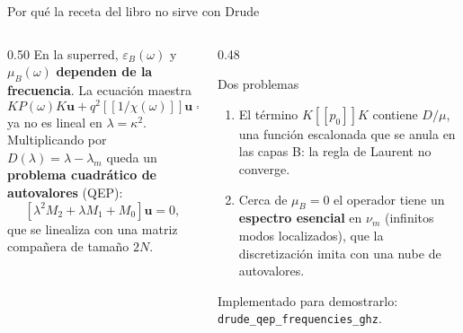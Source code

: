 \documentclass[aspectratio=169,10pt]{beamer}
\newcommand{\num}{\nu_m}
\newcommand{\toep}[1]{[\![#1]\!]}
\begin{document}
\begin{frame}{Por qué la receta del libro no sirve con Drude}
  \begin{columns}[T]
    \begin{column}{0.50\textwidth}
      \small
      En la superred, $\varepsilon_B(\omega)$ y $\mu_B(\omega)$ \textbf{dependen de la frecuencia}. La ecuación maestra
      \[K P(\omega) K\mathbf u + q^2\toep{1/\chi(\omega)}\mathbf u=\kappa^2\toep{\psi(\omega)}\mathbf u\]
      ya no es lineal en $\lambda=\kappa^2$. Multiplicando por $D(\lambda)=\lambda-\lambda_m$ queda un
      \textbf{problema cuadrático de autovalores} (QEP):
      \[\left[\lambda^2M_2+\lambda M_1+M_0\right]\mathbf u=0,\]
      que se linealiza con una matriz compañera de tamaño $2N$.
    \end{column}
    \begin{column}{0.48\textwidth}
      \begin{alertblock}{Dos problemas}
        \small
        \begin{enumerate}
          \item El término $K\toep{p_0}K$ contiene $D/\mu$, una función escalonada que se anula en las
            capas B: la regla de Laurent no converge.
          \item Cerca de $\mu_B=0$ el operador tiene un \textbf{espectro esencial} en $\num$ (infinitos
            modos localizados), que la discretización imita con una nube de autovalores.
        \end{enumerate}
      \end{alertblock}
      \small Implementado para demostrarlo: \texttt{drude\_qep\_frequencies\_ghz}.
    \end{column}
  \end{columns}
\end{frame}
\end{document}
